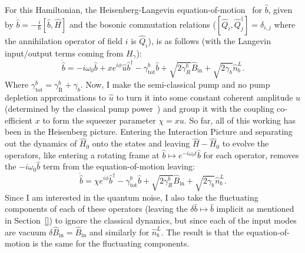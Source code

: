 For this Hamiltonian, the Heisenberg-Langevin equation-of-motion~\cite{} for $\hat b$, given by $\dot{\hat b}=-\frac{i}{\hbar}[\hat b,\hat H]$ and the bosonic commutation relations ($[\hat Q_i,\hat Q_j^\dag]=\delta_{i,j}$ where the annihilation operator of field $i$ is $\hat Q_i$), is as follows (with the Langevin input/output terms coming from $H_\gamma$): $$\dot{\hat{b}}= -i\omega_0 \hat b+x e^{i\phi} \hat u\hat b^\dag - \gamma^b_\mathrm{tot} \hat{b} + \sqrt{2\gamma^b_R}\hat{B}_\mathrm{in} + \sqrt{2\gamma_b}\hat{n}^L_b.$$ Where $\gamma^b_\text{tot}=\gamma^b_\text{R}+\gamma_b$. Now, I make the semi-classical pump and no pump depletion approximations to $\hat u$ to turn it into some constant coherent amplitude $u$ (determined by the classical pump power~\cite{}) and group it with the coupling co-efficient $x$ to form the squeezer parameter $\chi = x u$. So far, all of this working has been in the Heisenberg picture. Entering the Interaction Picture and separating out the dynamics of $\hat H_0$ onto the states and leaving $\hat H - \hat H_0$ to evolve the operators, like entering a rotating frame at $\hat b \mapsto e^{-i\omega_0 t} \hat b$ for each operator, removes the $-i\omega_0 \hat b$ term from the equation-of-motion leaving: $$\dot{\hat{b}}= \chi e^{i\phi}\hat b^\dag - \gamma^b_\mathrm{tot} \hat{b} + \sqrt{2\gamma^b_R}\hat{B}_\mathrm{in} + \sqrt{2\gamma_b}\hat{n}^L_b.$$ Since I am interested in the quantum noise, I also take the fluctuating components of each of these operators (leaving the $\delta \hat b\mapsto\hat b$ implicit as mentioned in Section~\ref{}) to ignore the classical dynamics, but since each of the input modes are vacuum $\delta\hat{B}_\mathrm{in}=\hat{B}_\mathrm{in}$ and similarly for $\hat{n}^L_b$.  The result is that the equation-of-motion is the same for the fluctuating components.

